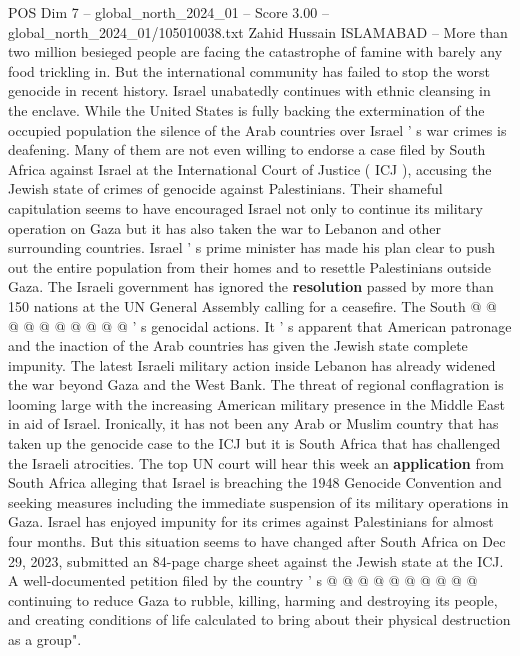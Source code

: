 \begin{textsample}{POS Dim 7 – global\_north\_2024\_01 – Score 3.00 – global\_north\_2024\_01/105010038.txt}  \label{ex:f7_pos_241}
Zahid Hussain ISLAMABAD -- More than two million besieged people are facing the catastrophe of famine with barely any food trickling in.
But the international community has failed to stop the worst genocide in recent history.
Israel unabatedly continues with ethnic cleansing in the enclave.
While the United States is fully backing the extermination of the occupied population the silence of the Arab countries over Israel ' s war crimes is deafening.
Many of them are not even willing to endorse a case filed by South Africa against Israel at the International Court of Justice ( ICJ ), accusing the Jewish state of crimes of genocide against Palestinians.
Their shameful capitulation seems to have encouraged Israel not only to continue its military operation on Gaza but it has also taken the war to Lebanon and other surrounding countries.
Israel ' s prime minister has made his plan clear to push out the entire population from their homes and to resettle Palestinians outside Gaza.
The Israeli government has ignored the \textbf{resolution} passed by more than 150 nations at the UN General Assembly calling for a ceasefire.
The South @ @ @ @ @ @ @ @ @ @ ' s genocidal actions.
It ' s apparent that American patronage and the inaction of the Arab countries has given the Jewish state complete impunity.
The latest Israeli military action inside Lebanon has already widened the war beyond Gaza and the West Bank.
The threat of regional conflagration is looming large with the increasing American military presence in the Middle East in aid of Israel.
Ironically, it has not been any Arab or Muslim country that has taken up the genocide case to the ICJ but it is South Africa that has challenged the Israeli atrocities.
The top UN court will hear this week an \textbf{application} from South Africa alleging that Israel is breaching the 1948 Genocide Convention and seeking measures including the immediate suspension of its military operations in Gaza.
Israel has enjoyed impunity for its crimes against Palestinians for almost four months.
But this situation seems to have changed after South Africa on Dec 29, 2023, submitted an 84-page charge sheet against the Jewish state at the ICJ.
A well-documented petition filed by the country ' s @ @ @ @ @ @ @ @ @ @ continuing to reduce Gaza to rubble, killing, harming and destroying its people, and creating conditions of life calculated to bring about their physical destruction as a group".

\end{textsample}
